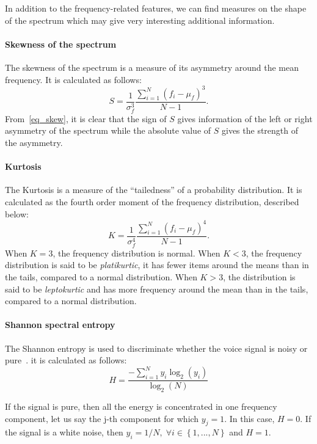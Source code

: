 In addition to the frequency-related features, we can find measures on the shape of the spectrum which may give very interesting additional information. 
\paragraph{Skewness of the spectrum}
The skewness of the spectrum is a measure of its asymmetry around the mean frequency. It is calculated as follows:
\begin{equation}
\label{eq_skew}
	S = \frac{1}{\sigma_f^3}\frac{\sum\limits_{i=1}^{N} \left(f_i - \mu_f\right)^3}{N-1}.
\end{equation}
From~\eqref{eq_skew}, it is clear that the sign of $S$ gives information of the left or right asymmetry of the spectrum while the absolute value of $S$ gives the strength of the asymmetry. 
\paragraph{Kurtosis}
The Kurtosis is a measure of the ``tailedness'' of a probability distribution. It is calculated as the fourth order moment of the frequency distribution, described below:
\begin{equation}
\label{eq_kurtosis}
	K = \frac{1}{\sigma_f^4}\frac{\sum\limits_{i=1}^{N} \left(f_i - \mu_f\right)^4}{N-1}.
\end{equation}
When $K=3$, the frequency distribution is normal. When $K<3$, the frequency distribution is said to be \textit{platikurtic}, it has fewer items around the means than in the tails, compared to a normal distribution. When $K>3$, the distribution is said to be \textit{leptokurtic} and has more frequency around the mean than in the tails, compared to a normal distribution.
\paragraph{Shannon spectral entropy}
The Shannon entropy is used to discriminate whether the voice signal is noisy or pure~\cite{Nunes2004}. it is calculated as follows:
\begin{equation}
\label{eq:entropy}
	H = \frac{-\sum\limits_{i=1}^{N} y_i \log_2 \left(y_i\right)}{\log_2 \left(N\right)}
\end{equation}

If the signal is pure, then all the energy is concentrated in one frequency component, let us say the j-th component for which $y_j = 1$. In this case, $H=0$. If the signal is a white noise, then $y_i = 1/N, \; \forall i \in \left\lbrace 1,...,N \right\rbrace$ and $H=1$.

